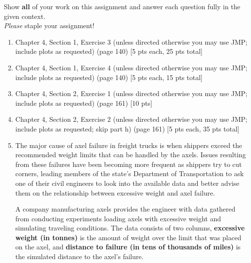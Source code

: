 \documentclass[11pt]{article}\usepackage[]{graphicx}\usepackage[]{color}
\begin{document}

\pagestyle{fancy} 

Show \textbf{all} of your work on this assignment and answer each question fully in the given context. \\


\emph{Please} staple your assignment!

\begin{enumerate}
	
	\item Chapter 4, Section 1, Exercise 3  (unless directed otherwise you may use JMP; include plots as requested) (page 140) [5 pts each, 25 pts total]
	
	\item Chapter 4, Section 1, Exercise 4  (unless directed otherwise you may use JMP; include plots as requested) (page 140) [5 pts each, 15 pts total]	
	
	\item Chapter 4, Section 2, Exercise 1  (unless directed otherwise you may use JMP; include plots as requested) (page 161) [10 pts]
	
	\item Chapter 4, Section 2, Exercise 2  (unless directed otherwise you may use JMP; include plots as requested; skip part h) (page 161) [5 pts each, 35 pts total]
	



\item
The major cause of axel failure in freight trucks is when shippers exceed the recommended weight limits that can be handled by the axels. 
Issues resulting from these failures have been becoming more frequent as shippers try to cut corners, 
leading members of the state's Department of Transportation to ask one of their civil engineers 
to look into the available data and better advise them on the relationship between excessive weight and axel failure.

A company manufacturing axels provides the engineer with data gathered from conducting experiments loading axels with excessive weight and simulating traveling conditions.
The data consists of two columns, \textbf{excessive weight (in tonnes)} is the amount of weight over the limit that was placed on the axel, and 
\textbf{distance to failure (in tens of thousands of miles)} is the simulated distance to the axel's failure. 


\begin{center}
\end{center}


\end{enumerate}
\end{document}
